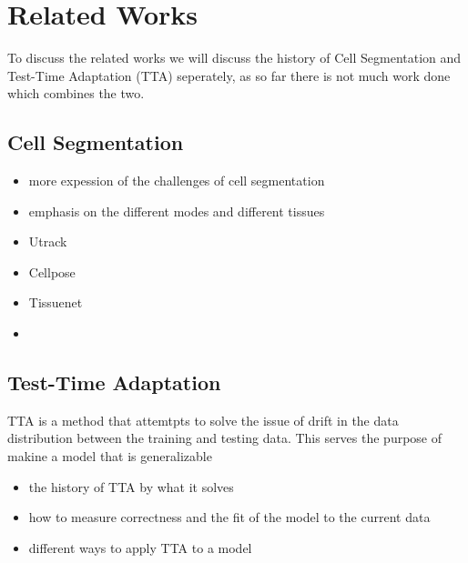 \section{Related Works}
To discuss the related works we will discuss the history of Cell Segmentation and Test-Time Adaptation (TTA) seperately, as so far there is not much work done which combines the two.

\subsection{Cell Segmentation}
\begin{itemize}

    \item more expession of the challenges of cell segmentation 
    \item emphasis on the different modes and different tissues

    \item Utrack 
    \item Cellpose
    \item Tissuenet
    \item 
\end{itemize}

\subsection{Test-Time Adaptation}

TTA is a method that attemtpts to solve the issue of drift in the data distribution between the training and testing data. This serves the purpose of makine a model that is generalizable 


\begin{itemize}
\item the history of TTA by what it solves 
\item how to measure correctness and the fit of the model to the current data
\item different ways to apply TTA to a model
\end{itemize}





